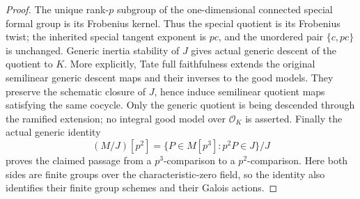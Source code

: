 \begin{proof}
The unique rank-\(p\) subgroup of the one-dimensional connected
special formal group is its Frobenius kernel. Thus the special
quotient is its Frobenius twist; the inherited special tangent
exponent is \(pc\), and the unordered pair \(\{c,pc\}\) is
unchanged. Generic inertia stability of \(J\) gives actual
generic descent of the quotient to \(K\).
More explicitly, Tate full faithfulness extends the original
semilinear generic descent maps and their inverses to the good
models. They preserve the schematic closure of \(J\), hence
induce semilinear quotient maps satisfying the same cocycle.
Only the generic quotient is being descended through the
ramified extension; no integral good model over \(\mathcal O_K\)
is asserted.
Finally the actual generic identity
\[
 (M/J)[p^2]=\{P\in M[p^3]:p^2P\in J\}/J
 \tag{B-RD69.8}
\]
proves the claimed passage from a \(p^3\)-comparison to a
\(p^2\)-comparison. Here both sides are finite groups over
the characteristic-zero field, so the identity also identifies
their finite group schemes and their Galois actions.
\end{proof}

